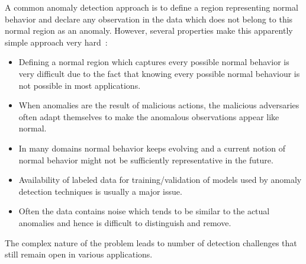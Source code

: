 A common anomaly detection approach is to define a region representing normal behavior and declare any observation in the data which does not belong to this normal region as an anomaly. However, several properties make this apparently simple approach very hard~\cite{chandola2009anomaly,pang2020deep}:
\begin{itemize}
    \item Defining a normal region which captures every possible normal behavior is very difficult due to the fact that knowing every possible normal behaviour is not possible in most applications.
    \item When anomalies are the result of malicious actions, the malicious adversaries often adapt themselves to make the anomalous observations appear like normal.
    \item In many domains normal behavior keeps evolving and a current notion of normal behavior might not be sufficiently representative in the future.
    \item Availability of labeled data for training/validation of models used by anomaly detection techniques is usually a major issue.
    \item Often the data contains noise which tends to be similar to the actual anomalies and hence is difficult to distinguish and remove.
\end{itemize}

The complex nature of the problem leads to number of detection challenges that still remain open in various applications.

